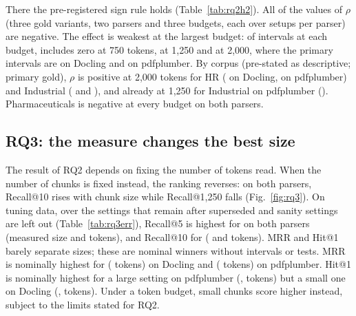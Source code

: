 There the pre-registered sign rule holds (Table~\ref{tab:rq2h2}). All
\RQtwoHTwoNegative{} of the \RQtwoHTwoValues{} values of $\rho$ (three gold
variants, two parsers and three budgets, each over
\RQtwoHTwoSetupsPerParser{} setups per parser) are negative. The effect is weakest at the largest budget: of
\RQtwoHTwoLargestBudgetValues{} intervals at each budget,
\RQtwoHTwoIncludeZeroSevenFiveZero{} includes zero at 750 tokens,
\RQtwoHTwoIncludeZeroOneTwoFiveZero{} at 1,250 and
\RQtwoHTwoLargestBudgetIncludeZero{} at 2,000, where the primary intervals are
\RQtwoHTwoDropRuleDoclingTwoZeroZeroZeroCI{} on Docling and
\RQtwoHTwoDropRulePdfplumberTwoZeroZeroZeroCI{} on pdfplumber. By corpus
(pre-stated as descriptive; primary gold), $\rho$ is positive at 2,000 tokens for
HR (\RQtwoHTwoHrDoclingTwoZeroZeroZero{} on Docling,
\RQtwoHTwoHrPdfplumberTwoZeroZeroZero{} on pdfplumber) and Industrial
(\RQtwoHTwoIndustrialDoclingTwoZeroZeroZero{} and
\RQtwoHTwoIndustrialPdfplumberTwoZeroZeroZero{}), and already at 1,250 for
Industrial on pdfplumber (\RQtwoHTwoIndustrialPdfplumberOneTwoFiveZero{}).
Pharmaceuticals is negative at every budget on both parsers.

\subsection{RQ3: the measure changes the best size}\label{sec:rq3}




The result of RQ2 depends on fixing the number of tokens read. When the number of chunks is fixed instead, the ranking reverses: on both
parsers, Recall@10 rises with chunk size while Recall@1,250 falls
(Fig.~\ref{fig:rq3}). On
tuning data, over the \RQthreeSettingsKept{} settings that remain after
\RQthreeSupersededSettings{} superseded and \RQthreeSanitySettings{} sanity
settings are left out (Table~\ref{tab:rq3err}), Recall@5 is highest for
\RQthreeDoclingRecallFiveBest{} on both parsers (measured size
\RQthreeDoclingRecallFiveSize{} and \RQthreePdfplumberRecallFiveSize{}
tokens), and Recall@10 for \RQthreeDoclingRecallOneZeroBest{}
(\RQthreeDoclingRecallOneZeroSize{} and \RQthreePdfplumberRecallOneZeroSize{}
tokens). MRR and Hit@1 barely separate sizes; these are nominal winners without
intervals or tests. MRR is nominally highest for \RQthreeDoclingMrrBest{}
(\RQthreeDoclingMrrSize{} tokens) on Docling and \RQthreePdfplumberMrrBest{}
(\RQthreePdfplumberMrrSize{} tokens) on pdfplumber. Hit@1 is nominally highest for a large setting on pdfplumber (\RQthreePdfplumberHitOneBest{},
\RQthreePdfplumberHitOneSize{} tokens) but a small one on Docling
(\RQthreeDoclingHitOneBest{}, \RQthreeDoclingHitOneSize{} tokens).
Under a token budget, small chunks score higher instead, subject to the limits
stated for RQ2.

